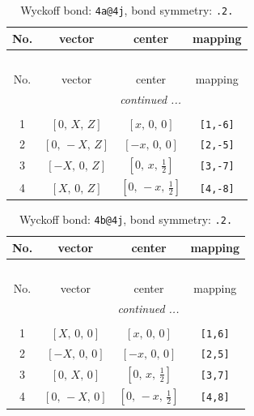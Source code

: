 \documentclass[fleqn,8pt]{jsarticle}
\begin{document}
\begin{longtable}{cccc}
\caption{Wyckoff bond: {\tt 4a@4j}, bond symmetry: {\tt .2.}}
 \\
 \hline \hline
No. & vector & center & mapping \\ \hline \endfirsthead

\multicolumn{3}{l}{\tablename\ \thetable{}} \\
 \hline \hline
No. & vector & center & mapping \\ \hline \endhead

 \hline \hline
\multicolumn{3}{r}{\footnotesize\it continued ...} \\ \endfoot

 \hline \hline
\multicolumn{3}{r}{} \\ \endlastfoot

1 & $\left[ 0,\, X,\, Z \right]$ & $\left[ x,\, 0,\, 0 \right]$ & {\tt [1,-6]} \\ \hline
2 & $\left[ 0,\, - X,\, Z \right]$ & $\left[ - x,\, 0,\, 0 \right]$ & {\tt [2,-5]} \\ \hline
3 & $\left[ - X,\, 0,\, Z \right]$ & $\left[ 0,\, x,\, \frac{1}{2} \right]$ & {\tt [3,-7]} \\ \hline
4 & $\left[ X,\, 0,\, Z \right]$ & $\left[ 0,\, - x,\, \frac{1}{2} \right]$ & {\tt [4,-8]} \\
\end{longtable}
\renewcommand{\arraystretch}{1.2}
\begin{longtable}{cccc}
\caption{Wyckoff bond: {\tt 4b@4j}, bond symmetry: {\tt .2.}}
 \\
 \hline \hline
No. & vector & center & mapping \\ \hline \endfirsthead

\multicolumn{3}{l}{\tablename\ \thetable{}} \\
 \hline \hline
No. & vector & center & mapping \\ \hline \endhead

 \hline \hline
\multicolumn{3}{r}{\footnotesize\it continued ...} \\ \endfoot

 \hline \hline
\multicolumn{3}{r}{} \\ \endlastfoot

1 & $\left[ X,\, 0,\, 0 \right]$ & $\left[ x,\, 0,\, 0 \right]$ & {\tt [1,6]} \\ \hline
2 & $\left[ - X,\, 0,\, 0 \right]$ & $\left[ - x,\, 0,\, 0 \right]$ & {\tt [2,5]} \\ \hline
3 & $\left[ 0,\, X,\, 0 \right]$ & $\left[ 0,\, x,\, \frac{1}{2} \right]$ & {\tt [3,7]} \\ \hline
4 & $\left[ 0,\, - X,\, 0 \right]$ & $\left[ 0,\, - x,\, \frac{1}{2} \right]$ & {\tt [4,8]} \\
\end{longtable}
\end{document}

